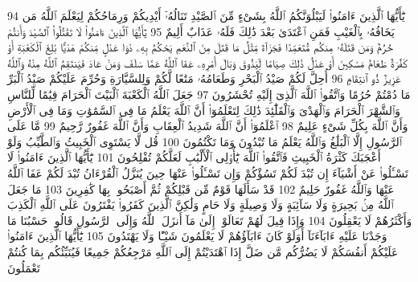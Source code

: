 {\tiny\colorbox{cl_aya}{94}} يَٰٓأَيُّهَا ٱلَّذِينَ ءَامَنُوا۟ لَيَبْلُوَنَّكُمُ ٱللَّهُ بِشَىْءٍ مِّنَ ٱلصَّيْدِ تَنَالُهُۥٓ أَيْدِيكُمْ وَرِمَاحُكُمْ لِيَعْلَمَ ٱللَّهُ مَن يَخَافُهُۥ بِٱلْغَيْبِ فَمَنِ ٱعْتَدَىٰ بَعْدَ ذَٰلِكَ فَلَهُۥ عَذَابٌ أَلِيمٌ
{\tiny\colorbox{cl_aya}{95}} يَٰٓأَيُّهَا ٱلَّذِينَ ءَامَنُوا۟ لَا تَقْتُلُوا۟ ٱلصَّيْدَ وَأَنتُمْ حُرُمٌ وَمَن قَتَلَهُۥ مِنكُم مُّتَعَمِّدًا فَجَزَآءٌ مِّثْلُ مَا قَتَلَ مِنَ ٱلنَّعَمِ يَحْكُمُ بِهِۦ ذَوَا عَدْلٍ مِّنكُمْ هَدْيًۢا بَٰلِغَ ٱلْكَعْبَةِ أَوْ كَفَّٰرَةٌ طَعَامُ مَسَٰكِينَ أَوْ عَدْلُ ذَٰلِكَ صِيَامًا لِّيَذُوقَ وَبَالَ أَمْرِهِۦ عَفَا ٱللَّهُ عَمَّا سَلَفَ وَمَنْ عَادَ فَيَنتَقِمُ ٱللَّهُ مِنْهُ وَٱللَّهُ عَزِيزٌ ذُو ٱنتِقَامٍ
{\tiny\colorbox{cl_aya}{96}} أُحِلَّ لَكُمْ صَيْدُ ٱلْبَحْرِ وَطَعَامُهُۥ مَتَٰعًا لَّكُمْ وَلِلسَّيَّارَةِ وَحُرِّمَ عَلَيْكُمْ صَيْدُ ٱلْبَرِّ مَا دُمْتُمْ حُرُمًا وَٱتَّقُوا۟ ٱللَّهَ ٱلَّذِىٓ إِلَيْهِ تُحْشَرُونَ
{\tiny\colorbox{cl_aya}{97}} جَعَلَ ٱللَّهُ ٱلْكَعْبَةَ ٱلْبَيْتَ ٱلْحَرَامَ قِيَٰمًا لِّلنَّاسِ وَٱلشَّهْرَ ٱلْحَرَامَ وَٱلْهَدْىَ وَٱلْقَلَٰٓئِدَ ذَٰلِكَ لِتَعْلَمُوٓا۟ أَنَّ ٱللَّهَ يَعْلَمُ مَا فِى ٱلسَّمَٰوَٰتِ وَمَا فِى ٱلْأَرْضِ وَأَنَّ ٱللَّهَ بِكُلِّ شَىْءٍ عَلِيمٌ
{\tiny\colorbox{cl_aya}{98}} ٱعْلَمُوٓا۟ أَنَّ ٱللَّهَ شَدِيدُ ٱلْعِقَابِ وَأَنَّ ٱللَّهَ غَفُورٌ رَّحِيمٌ
{\tiny\colorbox{cl_aya}{99}} مَّا عَلَى ٱلرَّسُولِ إِلَّا ٱلْبَلَٰغُ وَٱللَّهُ يَعْلَمُ مَا تُبْدُونَ وَمَا تَكْتُمُونَ
{\tiny\colorbox{cl_aya}{100}} قُل لَّا يَسْتَوِى ٱلْخَبِيثُ وَٱلطَّيِّبُ وَلَوْ أَعْجَبَكَ كَثْرَةُ ٱلْخَبِيثِ فَٱتَّقُوا۟ ٱللَّهَ يَٰٓأُو۟لِى ٱلْأَلْبَٰبِ لَعَلَّكُمْ تُفْلِحُونَ
{\tiny\colorbox{cl_aya}{101}} يَٰٓأَيُّهَا ٱلَّذِينَ ءَامَنُوا۟ لَا تَسْـَٔلُوا۟ عَنْ أَشْيَآءَ إِن تُبْدَ لَكُمْ تَسُؤْكُمْ وَإِن تَسْـَٔلُوا۟ عَنْهَا حِينَ يُنَزَّلُ ٱلْقُرْءَانُ تُبْدَ لَكُمْ عَفَا ٱللَّهُ عَنْهَا وَٱللَّهُ غَفُورٌ حَلِيمٌ
{\tiny\colorbox{cl_aya}{102}} قَدْ سَأَلَهَا قَوْمٌ مِّن قَبْلِكُمْ ثُمَّ أَصْبَحُوا۟ بِهَا كَٰفِرِينَ
{\tiny\colorbox{cl_aya}{103}} مَا جَعَلَ ٱللَّهُ مِنۢ بَحِيرَةٍ وَلَا سَآئِبَةٍ وَلَا وَصِيلَةٍ وَلَا حَامٍ وَلَٰكِنَّ ٱلَّذِينَ كَفَرُوا۟ يَفْتَرُونَ عَلَى ٱللَّهِ ٱلْكَذِبَ وَأَكْثَرُهُمْ لَا يَعْقِلُونَ
{\tiny\colorbox{cl_aya}{104}} وَإِذَا قِيلَ لَهُمْ تَعَالَوْا۟ إِلَىٰ مَآ أَنزَلَ ٱللَّهُ وَإِلَى ٱلرَّسُولِ قَالُوا۟ حَسْبُنَا مَا وَجَدْنَا عَلَيْهِ ءَابَآءَنَآ أَوَلَوْ كَانَ ءَابَآؤُهُمْ لَا يَعْلَمُونَ شَيْـًٔا وَلَا يَهْتَدُونَ
{\tiny\colorbox{cl_aya}{105}} يَٰٓأَيُّهَا ٱلَّذِينَ ءَامَنُوا۟ عَلَيْكُمْ أَنفُسَكُمْ لَا يَضُرُّكُم مَّن ضَلَّ إِذَا ٱهْتَدَيْتُمْ إِلَى ٱللَّهِ مَرْجِعُكُمْ جَمِيعًا فَيُنَبِّئُكُم بِمَا كُنتُمْ تَعْمَلُونَ
